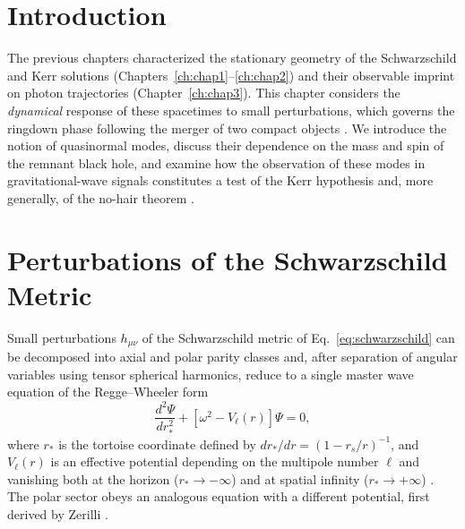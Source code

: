 \cleardoublepage
{}
{}
\ChapterHeader

\section{Introduction}
\label{ch:chap4}
The previous chapters characterized the stationary geometry of the Schwarzschild and Kerr solutions (Chapters~\ref{ch:chap1}--\ref{ch:chap2}) and their observable imprint on photon trajectories (Chapter~\ref{ch:chap3}). This chapter considers the \emph{dynamical} response of these spacetimes to small perturbations, which governs the ringdown phase following the merger of two compact objects \cite{regge1957}. We introduce the notion of quasinormal modes, discuss their dependence on the mass and spin of the remnant black hole, and examine how the observation of these modes in gravitational-wave signals constitutes a test of the Kerr hypothesis and, more generally, of the no-hair theorem \cite{berti2009}.

\section{Perturbations of the Schwarzschild Metric}

Small perturbations $h_{\mu\nu}$ of the Schwarzschild metric of Eq.~\eqref{eq:schwarzschild} can be decomposed into axial and polar parity classes and, after separation of angular variables using tensor spherical harmonics, reduce to a single master wave equation of the Regge--Wheeler form \cite{regge1957}
\begin{equation}
	\frac{d^2\Psi}{dr_*^2} + \left[\omega^2 - V_{\ell}(r)\right]\Psi = 0,
	\label{eq:regge-wheeler}
\end{equation}
where $r_*$ is the tortoise coordinate defined by $dr_*/dr = (1-r_s/r)^{-1}$, and $V_{\ell}(r)$ is an effective potential depending on the multipole number $\ell$ and vanishing both at the horizon ($r_*\to-\infty$) and at spatial infinity ($r_*\to+\infty$) \cite{misner1973}. The polar sector obeys an analogous equation with a different potential, first derived by Zerilli \cite{zerilli1970}.

